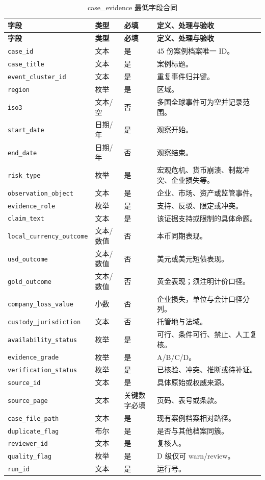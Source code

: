 \documentclass[UTF8,fontset=windows,12pt,openany]{ctexbook}
\newcommand{\Field}[1]{{\small\nolinkurl{#1}}}
\begin{document}
\begin{longtable}{p{3.7cm}p{2.4cm}p{2.1cm}p{5.0cm}}
\caption{case\_evidence 最低字段合同}\label{tab:dict-case}\\
\toprule
\textbf{字段} & \textbf{类型} & \textbf{必填} & \textbf{定义、处理与验收}\\
\midrule
\endfirsthead
\toprule \textbf{字段} & \textbf{类型} & \textbf{必填} & \textbf{定义、处理与验收}\\ \midrule
\endhead
\Field{case_id} & 文本 & 是 & 45 份案例档案唯一 ID。\\
\Field{case_title} & 文本 & 是 & 案例标题。\\
\Field{event_cluster_id} & 文本 & 是 & 重复事件归并键。\\
\Field{region} & 枚举 & 是 & 区域。\\
\Field{iso3} & 文本/空 & 否 & 多国全球事件可为空并记录范围。\\
\Field{start_date} & 日期/年 & 是 & 观察开始。\\
\Field{end_date} & 日期/年 & 否 & 观察结束。\\
\Field{risk_type} & 枚举 & 是 & 宏观危机、货币崩溃、制裁冲突、企业损失等。\\
\Field{observation_object} & 文本 & 是 & 企业、市场、资产或监管事件。\\
\Field{evidence_role} & 枚举 & 是 & 支持、反驳、限定或冲突。\\
\Field{claim_text} & 文本 & 是 & 该证据支持或限制的具体命题。\\
\Field{local_currency_outcome} & 文本/数值 & 否 & 本币同期表现。\\
\Field{usd_outcome} & 文本/数值 & 否 & 美元或美元短债表现。\\
\Field{gold_outcome} & 文本/数值 & 否 & 黄金表现；须注明计价口径。\\
\Field{company_loss_value} & 小数 & 否 & 企业损失，单位与会计口径分列。\\
\Field{custody_jurisdiction} & 文本 & 否 & 托管地与法域。\\
\Field{availability_status} & 枚举 & 是 & 可行、条件可行、禁止、人工复核。\\
\Field{evidence_grade} & 枚举 & 是 & A/B/C/D。\\
\Field{verification_status} & 枚举 & 是 & 已核验、冲突、推断或待补证。\\
\Field{source_id} & 文本 & 是 & 具体原始或权威来源。\\
\Field{source_page} & 文本 & 关键数字必填 & 页码、表号或条款。\\
\Field{case_file_path} & 文本 & 是 & 现有案例档案相对路径。\\
\Field{duplicate_flag} & 布尔 & 是 & 是否与其他档案同簇。\\
\Field{reviewer_id} & 文本 & 是 & 复核人。\\
\Field{quality_flag} & 枚举 & 是 & D 级仅可 warn/review。\\
\Field{run_id} & 文本 & 是 & 运行号。\\
\bottomrule
\end{longtable}
\end{document}
